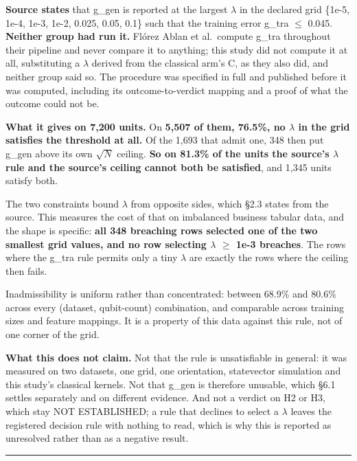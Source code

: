 \documentclass[
  10pt,
]{article}
\begin{document}
\textbf{Source states} that g\_gen is reported at the largest
\(\lambda\) in the declared grid \{1e-5, 1e-4, 1e-3, 1e-2, 0.025, 0.05,
0.1\} such that the training error g\_tra \(\le\) 0.045. \textbf{Neither
group had run it.} Flórez Ablan et al.~compute g\_tra throughout their
pipeline and never compare it to anything; this study did not compute it
at all, substituting a \(\lambda\) derived from the classical arm's C,
as they also did, and neither group said so. The procedure was specified
in full and published before it was computed, including its
outcome-to-verdict mapping and a proof of what the outcome could not be.

\textbf{What it gives on 7,200 units.} On \textbf{5,507 of them, 76.5\%,
no \(\lambda\) in the grid satisfies the threshold at all.} Of the 1,693
that admit one, 348 then put g\_gen above its own \(\sqrt{N}\) ceiling.
\textbf{So on 81.3\% of the units the source's \(\lambda\) rule and the
source's ceiling cannot both be satisfied}, and 1,345 units satisfy
both.

The two constraints bound \(\lambda\) from opposite sides, which \S{}2.3
states from the source. This measures the cost of that on imbalanced
business tabular data, and the shape is specific: \textbf{all 348
breaching rows selected one of the two smallest grid values, and no row
selecting \(\lambda\) \(\ge\) 1e-3 breaches}. The rows where the g\_tra
rule permits only a tiny \(\lambda\) are exactly the rows where the
ceiling then fails.

Inadmissibility is uniform rather than concentrated: between 68.9\% and
80.6\% across every (dataset, qubit-count) combination, and comparable
across training sizes and feature mappings. It is a property of this
data against this rule, not of one corner of the grid.

\textbf{What this does not claim.} Not that the rule is unsatisfiable in
general: it was measured on two datasets, one grid, one orientation,
statevector simulation and this study's classical kernels. Not that
g\_gen is therefore unusable, which \S{}6.1 settles separately and on
different evidence. And not a verdict on H2 or H3, which stay NOT
ESTABLISHED; a rule that declines to select a \(\lambda\) leaves the
registered decision rule with nothing to read, which is why this is
reported as unresolved rather than as a negative result.

\begin{center}\rule{0.5\linewidth}{0.5pt}\end{center}
\end{document}
